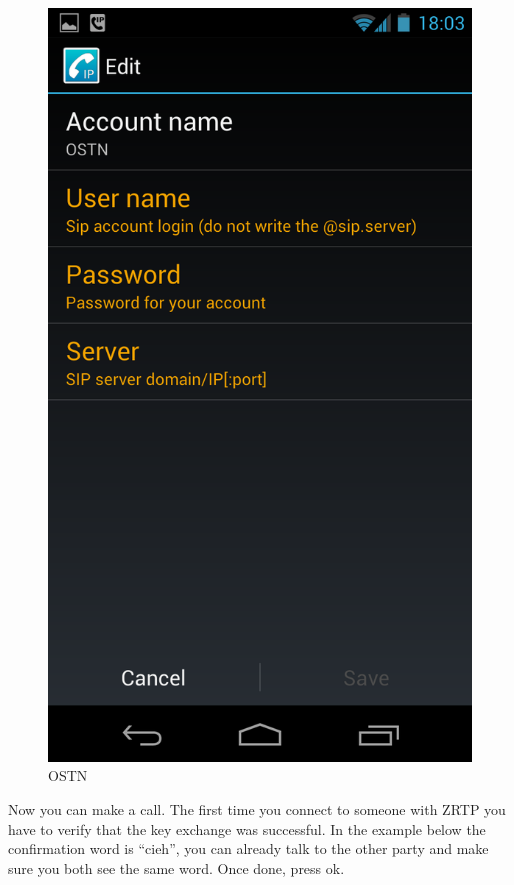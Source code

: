 \begin{figure}[htbp]
\centering
\includegraphics{ostn_2.png}
\caption{OSTN}
\end{figure}

Now you can make a call. The first time you connect to someone with ZRTP
you have to verify that the key exchange was successful. In the example
below the confirmation word is ``cieh'', you can already talk to the
other party and make sure you both see the same word. Once done, press
ok.

